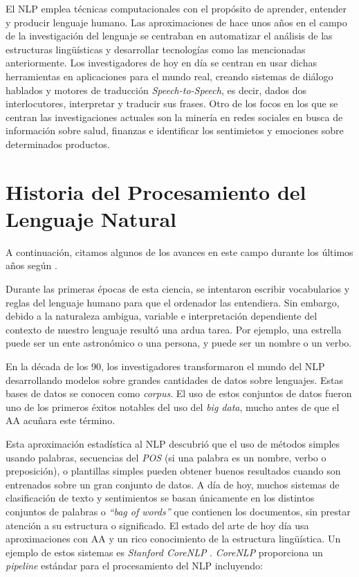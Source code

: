 El \ac{NLP} emplea técnicas computacionales con el propósito de aprender,
entender y producir lenguaje humano. Las aproximaciones de hace unos años en el
campo de la investigación del lenguaje se centraban en automatizar el análisis
de las estructuras lingüísticas y desarrollar tecnologías como las mencionadas
anteriormente. Los investigadores de hoy en día se centran en usar dichas
herramientas en aplicaciones para el mundo real, creando sistemas de diálogo
hablados y motores de traducción \emph{Speech-to-Speech}, es decir, dados dos
interlocutores, interpretar y traducir sus frases. Otro de los focos en los que
se centran las investigaciones actuales son la minería en redes sociales en
busca de información sobre salud, finanzas e identificar los sentimietos y
emociones sobre determinados productos. 

\section{Historia del Procesamiento del Lenguaje Natural}
\label{sec:currentnlp}

A continuación, citamos algunos de los avances en este campo durante los últimos
años según \citet{Hirschberg2015}.

Durante las primeras épocas de esta ciencia, se intentaron escribir vocabularios
y reglas del lenguaje humano para que el ordenador las entendiera. Sin embargo,
debido a la naturaleza ambigua, variable e interpretación dependiente del
contexto de nuestro lenguaje resultó una ardua tarea. Por ejemplo, una estrella
puede ser un ente astronómico o una persona, y puede ser un nombre o un verbo.

En la década de los 90, los investigadores transformaron el mundo del \ac{NLP}
desarrollando modelos sobre grandes cantidades de datos sobre lenguajes. Estas
bases de datos se conocen como \emph{corpus}. El uso de estos conjuntos de datos
fueron uno de los primeros éxitos notables del uso del \emph{big data}, mucho
antes de que el \ac{AA} acuñara este término.

Esta aproximación estadística al \ac{NLP} descubrió que el uso de métodos
simples usando palabras, secuencias del \emph{\ac{POS}} (si una palabra es un nombre, verbo o
preposición), o plantillas simples pueden obtener buenos resultados cuando son
entrenados sobre un gran conjunto de datos. A día de hoy, muchos sistemas de
clasificación de texto y sentimientos se basan únicamente en los distintos
conjuntos de palabras o \emph{``bag of words''} que contienen los documentos,
sin prestar atención a su estructura o significado. El estado del arte de hoy
día usa aproximaciones con \ac{AA} y un rico conocimiento de la estructura
lingüística. Un ejemplo de estos sistemas es \emph{Stanford CoreNLP}
\citep{Manning2014}. \emph{CoreNLP} proporciona un \emph{pipeline} estándar para
el procesamiento del \ac{NLP} incluyendo:

